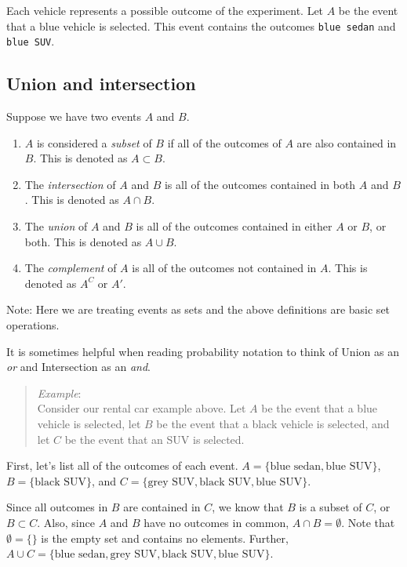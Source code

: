 \documentclass[
  letterpaper,
  DIV=11,
  numbers=noendperiod]{scrreprt}
\begin{document}
Each vehicle represents a possible outcome of the experiment. Let \(A\)
be the event that a blue vehicle is selected. This event contains the
outcomes \texttt{blue\ sedan} and \texttt{blue\ SUV}.

\subsection{Union and intersection}\label{union-and-intersection}

Suppose we have two events \(A\) and \(B\).

\begin{enumerate}
\def\labelenumi{\arabic{enumi})}
\item
  \(A\) is considered a \emph{subset} of \(B\) if all of the outcomes of
  \(A\) are also contained in \(B\). This is denoted as \(A \subset B\).
\item
  The \emph{intersection} of \(A\) and \(B\) is all of the outcomes
  contained in both \(A\) and \(B\). This is denoted as \(A \cap B\).
\item
  The \emph{union} of \(A\) and \(B\) is all of the outcomes contained
  in either \(A\) or \(B\), or both. This is denoted as \(A \cup B\).
\item
  The \emph{complement} of \(A\) is all of the outcomes not contained in
  \(A\). This is denoted as \(A^C\) or \(A'\).
\end{enumerate}

Note: Here we are treating events as sets and the above definitions are
basic set operations.

It is sometimes helpful when reading probability notation to think of
Union as an \emph{or} and Intersection as an \emph{and}.

\begin{quote}
\emph{Example}:\\
Consider our rental car example above. Let \(A\) be the event that a
blue vehicle is selected, let \(B\) be the event that a black vehicle is
selected, and let \(C\) be the event that an SUV is selected.
\end{quote}

First, let's list all of the outcomes of each event.
\(A = \{\mbox{blue sedan},\mbox{blue SUV}\}\),
\(B=\{\mbox{black SUV}\}\), and
\(C= \{\mbox{grey SUV}, \mbox{black SUV}, \mbox{blue SUV}\}\).

Since all outcomes in \(B\) are contained in \(C\), we know that \(B\)
is a subset of \(C\), or \(B\subset C\). Also, since \(A\) and \(B\)
have no outcomes in common, \(A \cap B = \emptyset\). Note that
\(\emptyset = \{ \}\) is the empty set and contains no elements.
Further,
\(A \cup C = \{\mbox{blue sedan}, \mbox{grey SUV}, \mbox{black SUV}, \mbox{blue SUV}\}\).
\end{document}
